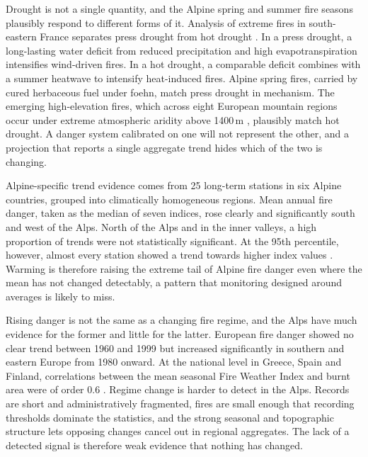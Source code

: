 \documentclass[11pt,a4paper]{article}
\begin{document}
Drought is not a single quantity, and the Alpine spring and summer fire seasons plausibly respond to different forms of it. Analysis of extreme fires in south-eastern France separates press drought from hot drought \citep{ruffault_extreme_2018}. In a press drought, a long-lasting water deficit from reduced precipitation and high evapotranspiration intensifies wind-driven fires. In a hot drought, a comparable deficit combines with a summer heatwave to intensify heat-induced fires. Alpine spring fires, carried by cured herbaceous fuel under foehn, match press drought in mechanism. The emerging high-elevation fires, which across eight European mountain regions occur under extreme atmospheric aridity above 1400\,m \citep{beloiu_climatedriven_2026}, plausibly match hot drought. A danger system calibrated on one will not represent the other, and a projection that reports a single aggregate trend hides which of the two is changing.

Alpine-specific trend evidence comes from 25 long-term stations in six Alpine countries, grouped into climatically homogeneous regions. Mean annual fire danger, taken as the median of seven indices, rose clearly and significantly south and west of the Alps. North of the Alps and in the inner valleys, a high proportion of trends were not statistically significant. At the 95th percentile, however, almost every station showed a trend towards higher index values \citep{wastl_recent_2012}. Warming is therefore raising the extreme tail of Alpine fire danger even where the mean has not changed detectably, a pattern that monitoring designed around averages is likely to miss.

Rising danger is not the same as a changing fire regime, and the Alps have much evidence for the former and little for the latter. European fire danger showed no clear trend between 1960 and 1999 but increased significantly in southern and eastern Europe from 1980 onward. At the national level in Greece, Spain and Finland, correlations between the mean seasonal Fire Weather Index and burnt area were of order 0.6 \citep{venalainen_temporal_2014}. Regime change is harder to detect in the Alps. Records are short and administratively fragmented, fires are small enough that recording thresholds dominate the statistics, and the strong seasonal and topographic structure lets opposing changes cancel out in regional aggregates. The lack of a detected signal is therefore weak evidence that nothing has changed.
\end{document}
